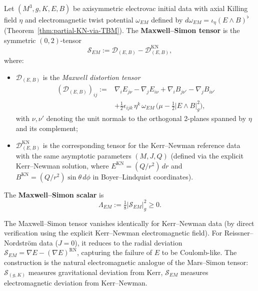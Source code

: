 \begin{definition}\label{def:maxwell-simon}
Let $(M^3, g, K, E, B)$ be axisymmetric electrovac initial data with axial Killing field $\eta$ and electromagnetic twist potential $\omega_{EM}$ defined by $d\omega_{EM} = \iota_\eta(E\wedge B)^\flat$ (Theorem~\ref{thm:partial-KN-via-TBM}). The \textbf{Maxwell--Simon tensor} is the symmetric $(0,2)$-tensor
\begin{equation}\label{eq:maxwell-simon-def}
\mathcal{S}_{EM} := \mathcal{D}_{(E,B)} - \mathcal{D}_{(E,B)}^{\mathrm{KN}},
\end{equation}
where:
\begin{itemize}
\item $\mathcal{D}_{(E,B)}$ is the \emph{Maxwell distortion tensor}
\begin{equation}\label{eq:maxwell-distortion}
\begin{aligned}
(\mathcal{D}_{(E,B)})_{ij} :={}& \nabla_i E_{j\nu} - \nabla_j E_{i\nu} + \nabla_i B_{j\nu'} - \nabla_j B_{i\nu'} \\
&+ \tfrac{1}{2}\epsilon_{ijk}\,\eta^k\,\omega_{EM}\,\bigl(\mu - \tfrac{1}{2}|E\wedge B|_g^2\bigr),
\end{aligned}
\end{equation}
with $\nu, \nu'$ denoting the unit normals to the orthogonal 2-planes spanned by $\eta$ and its complement;
\item $\mathcal{D}_{(E,B)}^{\mathrm{KN}}$ is the corresponding tensor for the Kerr--Newman reference data with the same asymptotic parameters $(M, J, Q)$ (defined via the explicit Kerr--Newman solution, where $E^{\mathrm{KN}} = (Q/r^2)\,dr$ and $B^{\mathrm{KN}} = (Q/r^2)\sin\theta\,d\phi$ in Boyer--Lindquist coordinates).
\end{itemize}
The \textbf{Maxwell--Simon scalar} is
\begin{equation}\label{eq:maxwell-simon-scalar}
\Lambda_{EM} := \tfrac{1}{8}|\mathcal{S}_{EM}|^2_g \geq 0.
\end{equation}
\end{definition}

\begin{remark}
The Maxwell--Simon tensor vanishes identically for Kerr--Newman data (by direct verification using the explicit Kerr--Newman electromagnetic field). For Reissner--Nordström data ($J=0$), it reduces to the radial deviation $\mathcal{S}_{EM} = \nabla E - (\nabla E)^{\mathrm{RN}}$, capturing the failure of $E$ to be Coulomb-like. The construction is the natural electromagnetic analogue of the Mars--Simon tensor: $\mathcal{S}_{(g,K)}$ measures gravitational deviation from Kerr, $\mathcal{S}_{EM}$ measures electromagnetic deviation from Kerr--Newman.
\end{remark}

